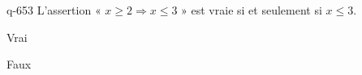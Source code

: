 \begin{truefalse}{q-653}
L'assertion « $x\geq 2 \Rightarrow x \leq 3$ » est vraie si et seulement si $x\leq 3$.
\item* Vrai
\item Faux
\end{truefalse}

